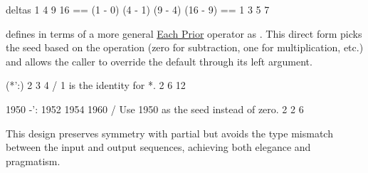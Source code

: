 \documentclass{article}
\begin{document}
\begin{code}
deltas 1 4 9 16 == (1 - 0) (4 - 1) (9 - 4) (16 - 9) == 1 3 5 7
\end{code}

 defines  in terms of a more general \href{https://code.kx.com/q/ref/maps/#each-prior}{Each Prior} operator as .
This direct form picks the seed based on the operation (zero for subtraction, one for multiplication, etc.)
and allows the caller to override the default through its left argument.

\begin{code}[q]
(*':) 2 3 4  / 1 is the identity for *.
2 6 12

1950 -': 1952 1954 1960 / Use 1950 as the seed instead of zero.
2 2 6
\end{code}

This design preserves symmetry with partial \href{https://code.kx.com/q/ref/sum/#sums}{}
but avoids the type mismatch between the input and output sequences, achieving both elegance and pragmatism.
\end{document}
